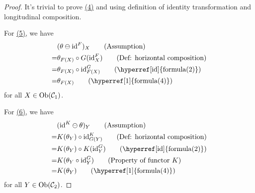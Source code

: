 \documentclass{article}
\begin{document}
\begin{proof}
	It's trivial to prove \hyperref[1]{(4)} and using definition of identity transformation and longitudinal composition.
	
	For \hyperref[2]{(5)}, we have
	\begin{align}
		 & (\theta\ominus\id^F)_X\tag{Assumption}\\
		=& \theta_{F(X)}\circ G(\id^F_X)\tag{Def: horizontal composition}\\
		=& \theta_{F(X)}\circ \id^G_{F(X)}\tag{\hyperref[id]{formula(2)}}\\
		=& \theta_{F(X)}\tag{\hyperref[1]{formula(4)}}
	\end{align}
	for all $X\in\mathrm{Ob}(\mathcal{C}_1)$.
	
	For \hyperref[3]{(6)}, we have
	\begin{align}
		 & (\id^K\ominus\theta)_Y\tag{Assumption}\\
		=& K(\theta_Y)\circ\id^K_{G(Y)}\tag{Def: horizontal composition}\\
		=& K(\theta_Y)\circ K(\id^G_Y)\tag{\hyperref[id]{formula(2)}}\\
		=& K(\theta_Y\circ\id^G_Y)\tag{Property of functor $K$}\\
		=& K(\theta_Y)\tag{\hyperref[1]{formula(4)}}
	\end{align}
	for all $Y\in\mathrm{Ob}(\mathcal{C}_2)$.
\end{proof}
\end{document}
